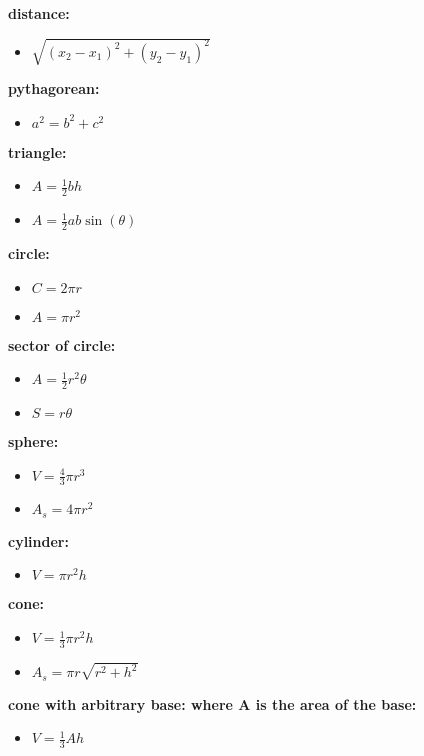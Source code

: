 \documentclass{article}
\begin{document}
\textbf{distance:}	
	\begin{itemize}
		\item $\sqrt{(x_2 - x_1)^2 + (y_2 - y_1)^2}$
	\end{itemize}	

\textbf{pythagorean:}
	\begin{itemize}
		\item $a^2 = b^2 + c^2$
	\end{itemize}

\textbf{triangle:}
	\begin{itemize}
		\item $A = \frac{1}{2}bh$
		\item $A = \frac{1}{2}ab\sin(\theta)$
	\end{itemize}

\textbf{circle:}	
	\begin{itemize}	
		\item $C = 2\pi r$
		\item $A = \pi r^2$ 
	\end{itemize}

\textbf{sector of circle:}
	\begin{itemize}
		\item $A = \frac{1}{2}r^2\theta$
		\item $S = r\theta$
	\end{itemize}

\textbf{sphere:}
	\begin{itemize}
		\item $V = \frac{4}{3}\pi r^3$
		\item $A_s = 4\pi r^2$
	\end{itemize}

\textbf{cylinder:}
	\begin{itemize}
		\item $V = \pi r^2h$
	\end{itemize}

\textbf{cone:}
	\begin{itemize}
		\item $V = \frac{1}{3}\pi r^2h$
		\item $A_s = \pi r\sqrt{r^2+h^2}$
	\end{itemize}

\textbf{cone with arbitrary base: where A is the area of the base:}
	\begin{itemize}
		\item $V = \frac{1}{3}Ah$
	\end{itemize}
\end{document}
